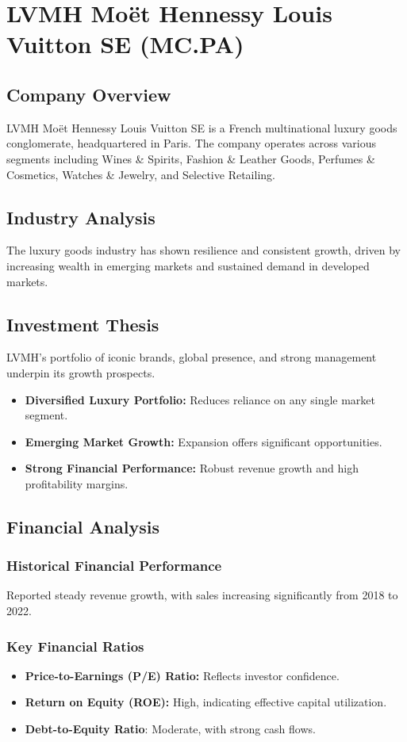 \documentclass[12pt]{report}
\begin{document}
\chapter{LVMH Moët Hennessy Louis Vuitton SE (MC.PA)}
\section{Company Overview}
LVMH Moët Hennessy Louis Vuitton SE is a French multinational luxury goods conglomerate, headquartered in Paris. The company operates across various segments including Wines \& Spirits, Fashion \& Leather Goods, Perfumes \& Cosmetics, Watches \& Jewelry, and Selective Retailing.

\section{Industry Analysis}
The luxury goods industry has shown resilience and consistent growth, driven by increasing wealth in emerging markets and sustained demand in developed markets.

\section{Investment Thesis}
LVMH's portfolio of iconic brands, global presence, and strong management underpin its growth prospects.

\begin{itemize}
    \item \textbf{Diversified Luxury Portfolio:} Reduces reliance on any single market segment.
    \item \textbf{Emerging Market Growth:} Expansion offers significant opportunities.
    \item \textbf{Strong Financial Performance:} Robust revenue growth and high profitability margins.
\end{itemize}

\section{Financial Analysis}
\subsection{Historical Financial Performance}
Reported steady revenue growth, with sales increasing significantly from 2018 to 2022.

\subsection{Key Financial Ratios}
\begin{itemize}
    \item \textbf{Price-to-Earnings (P/E) Ratio:} Reflects investor confidence.
    \item \textbf{Return on Equity (ROE):} High, indicating effective capital utilization.
    \item \textbf{Debt-to-Equity Ratio}: Moderate, with strong cash flows.
\end{itemize}
\end{document}
